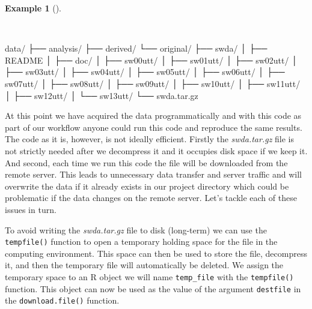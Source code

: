 \documentclass[
  letterpaper,
  DIV=11,
  numbers=noendperiod]{scrreport}
\newenvironment{Shaded}{\begin{snugshade}}{\end{snugshade}}
\newcommand{\ExtensionTok}[1]{\textcolor[rgb]{0.00,0.00,0.00}{#1}}
\newcommand{\NormalTok}[1]{\textcolor[rgb]{0.00,0.00,0.00}{#1}}
\theoremstyle{definition}
\newtheorem{example}{Example}[chapter]
\theoremstyle{remark}
\begin{document}
\begin{example}[]\protect\hypertarget{exm-ad-swda-decompress-location}{}\label{exm-ad-swda-decompress-location}

~

\begin{Shaded}
\begin{Highlighting}[]
\ExtensionTok{data/}
\ExtensionTok{├──}\NormalTok{ analysis/}
\ExtensionTok{├──}\NormalTok{ derived/}
\ExtensionTok{└──}\NormalTok{ original/}
    \ExtensionTok{├──}\NormalTok{ swda/}
    \ExtensionTok{│}\NormalTok{   ├── README}
    \ExtensionTok{│}\NormalTok{   ├── doc/}
    \ExtensionTok{│}\NormalTok{   ├── sw00utt/}
    \ExtensionTok{│}\NormalTok{   ├── sw01utt/}
    \ExtensionTok{│}\NormalTok{   ├── sw02utt/}
    \ExtensionTok{│}\NormalTok{   ├── sw03utt/}
    \ExtensionTok{│}\NormalTok{   ├── sw04utt/}
    \ExtensionTok{│}\NormalTok{   ├── sw05utt/}
    \ExtensionTok{│}\NormalTok{   ├── sw06utt/}
    \ExtensionTok{│}\NormalTok{   ├── sw07utt/}
    \ExtensionTok{│}\NormalTok{   ├── sw08utt/}
    \ExtensionTok{│}\NormalTok{   ├── sw09utt/}
    \ExtensionTok{│}\NormalTok{   ├── sw10utt/}
    \ExtensionTok{│}\NormalTok{   ├── sw11utt/}
    \ExtensionTok{│}\NormalTok{   ├── sw12utt/}
    \ExtensionTok{│}\NormalTok{   └── sw13utt/}
    \ExtensionTok{└──}\NormalTok{ swda.tar.gz}
\end{Highlighting}
\end{Shaded}

\end{example}

At this point we have acquired the data programmatically and with this
code as part of our workflow anyone could run this code and reproduce
the same results. The code as it is, however, is not ideally efficient.
Firstly the \emph{swda.tar.gz} file is not strictly needed after we
decompress it and it occupies disk space if we keep it. And second, each
time we run this code the file will be downloaded from the remote
server. This leads to unnecessary data transfer and server traffic and
will overwrite the data if it already exists in our project directory
which could be problematic if the data changes on the remote server.
Let's tackle each of these issues in turn.

To avoid writing the \emph{swda.tar.gz} file to disk (long-term) we can
use the \texttt{tempfile()} function to open a temporary holding space
for the file in the computing environment. This space can then be used
to store the file, decompress it, and then the temporary file will
automatically be deleted. We assign the temporary space to an R object
we will name \texttt{temp\_file} with the \texttt{tempfile()} function.
This object can now be used as the value of the argument
\texttt{destfile} in the \texttt{download.file()} function.
\end{document}
